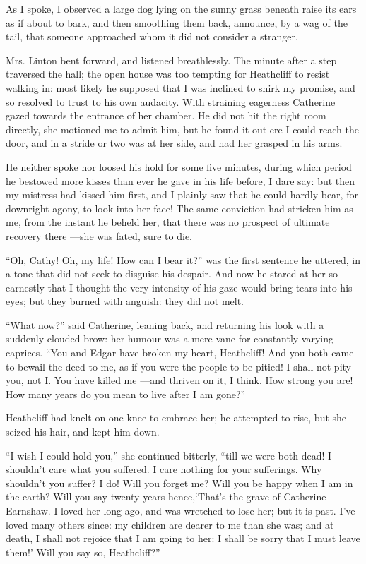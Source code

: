 \par As I spoke, I observed a large dog lying on the sunny grass beneath raise its ears as if about to bark, and then smoothing them back, announce, by a wag of the tail, that someone approached whom it did not consider a stranger.
\par Mrs. Linton bent forward, and listened breathlessly. The minute after a step traversed the hall; the open house was too tempting for Heathcliff to resist walking in: most likely he supposed that I was inclined to shirk my promise, and so resolved to trust to his own audacity. With straining eagerness Catherine gazed towards the entrance of her chamber. He did not hit the right room directly, she motioned me to admit him, but he found it out ere I could reach the door, and in a stride or two was at her side, and had her grasped in his arms.
\par He neither spoke nor loosed his hold for some five minutes, during which period he bestowed more kisses than ever he gave in his life before, I dare say: but then my mistress had kissed him first, and I plainly saw that he could hardly bear, for downright agony, to look into her face! The same conviction had stricken him as me, from the instant he beheld her, that there was no prospect of ultimate recovery there —she was fated, sure to die.
\par “Oh, Cathy! Oh, my life! How can I bear it?” was the first sentence he uttered, in a tone that did not seek to disguise his despair. And now he stared at her so earnestly that I thought the very intensity of his gaze would bring tears into his eyes; but they burned with anguish: they did not melt.
\par “What now?” said Catherine, leaning back, and returning his look with a suddenly clouded brow: her humour was a mere vane for constantly varying caprices. “You and Edgar have broken my heart, Heathcliff! And you both came to bewail the deed to me, as if you were the people to be pitied! I shall not pity you, not I. You have killed me —and thriven on it, I think. How strong you are! How many years do you mean to live after I am gone?”
\par Heathcliff had knelt on one knee to embrace her; he attempted to rise, but she seized his hair, and kept him down.
\par “I wish I could hold you,” she continued bitterly, “till we were both dead! I shouldn't care what you suffered. I care nothing for your sufferings. Why shouldn't you suffer? I do! Will you forget me? Will you be happy when I am in the earth? Will you say twenty years hence,‘That's the grave of Catherine Earnshaw. I loved her long ago, and was wretched to lose her; but it is past. I've loved many others since: my children are dearer to me than she was; and at death, I shall not rejoice that I am going to her: I shall be sorry that I must leave them!’ Will you say so, Heathcliff?”
